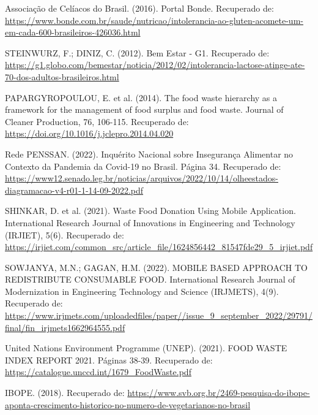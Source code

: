\documentclass[conference,compsoc]{IEEEtran}
\begin{document}
\begin{thebibliography}{00}

Associação de Celíacos do Brasil. (2016). Portal Bonde. Recuperado de: \url{https://www.bonde.com.br/saude/nutricao/intolerancia-ao-gluten-acomete-um-em-cada-600-brasileiros-426036.html}

STEINWURZ, F.; DINIZ, C. (2012). Bem Estar - G1. Recuperado de: \url{https://g1.globo.com/bemestar/noticia/2012/02/intolerancia-lactose-atinge-ate-70-dos-adultos-brasileiros.html}

PAPARGYROPOULOU, E. et al. (2014). The food waste hierarchy as a framework for the management of food surplus and food waste. Journal of Cleaner Production, 76, 106-115. Recuperado de: \url{https://doi.org/10.1016/j.jclepro.2014.04.020}

Rede PENSSAN. (2022). Inquérito Nacional sobre Insegurança Alimentar no Contexto da Pandemia da Covid-19 no Brasil. Página 34. Recuperado de: \url{https://www12.senado.leg.br/noticias/arquivos/2022/10/14/olheestados-diagramacao-v4-r01-1-14-09-2022.pdf}

SHINKAR, D. et al. (2021). Waste Food Donation Using Mobile Application. International Research Journal of Innovations in Engineering and Technology (IRJIET), 5(6). Recuperado de: \url{https://irjiet.com/common_src/article_file/1624856442_81547fde29_5_irjiet.pdf}

SOWJANYA, M.N.; GAGAN, H.M. (2022). MOBILE BASED APPROACH TO REDISTRIBUTE CONSUMABLE FOOD. International Research Journal of Modernization in Engineering Technology and Science (IRJMETS), 4(9). Recuperado de: \url{https://www.irjmets.com/uploadedfiles/paper//issue_9_september_2022/29791/final/fin_irjmets1662964555.pdf}

United Nations Environment Programme (UNEP). (2021). FOOD WASTE INDEX REPORT 2021. Páginas 38-39. Recuperado de: \url{https://catalogue.unccd.int/1679_FoodWaste.pdf}

IBOPE. (2018). Recuperado de: \url{https://www.svb.org.br/2469-pesquisa-do-ibope-aponta-crescimento-historico-no-numero-de-vegetarianos-no-brasil}




\end{thebibliography}
\end{document}
